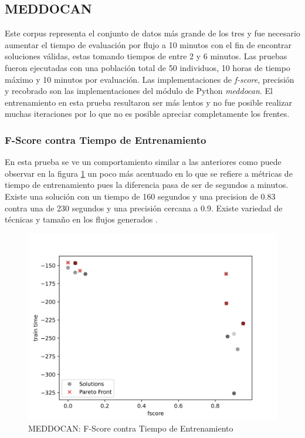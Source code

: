 \subsection{MEDDOCAN}
Este corpus representa el conjunto de datos m\'as grande de los tres y  fue necesario aumentar el tiempo de evaluaci\'on por flujo a 10 minutos con el fin de encontrar soluciones v\'alidas, estas tomando tiempos de entre 2 y 6 minutos. Las pruebas fueron ejecutadas con una poblaci\'on total de 50 individuos, 10 horas de tiempo m\'aximo y 10 minutos por evaluaci\'on. 
Las implementaciones de \textit{f-score}, precisi\'on y recobrado son las implementaciones del m\'odulo de Python \textit{meddocan}.
El entrenamiento en esta prueba resultaron ser m\'as lentos y no fue posible realizar muchas iteraciones por lo que no es posible apreciar completamente los frentes.


\subsubsection{F-Score contra Tiempo de Entrenamiento}
En esta prueba se ve un comportamiento similar a las anteriores como puede observar en la figura  \ref{impl:fig:MEDDOCAN:fscore_vs_train_time} un poco m\'as acentuado en lo que se refiere a m\'etricas de tiempo de entrenamiento pues la diferencia pasa de ser de segundos a minutos. Existe una soluci\'on con un tiempo de 160 segundos y una precision de 0.83 contra una de 230 segundos y una precisi\'on cercana a 0.9. Existe variedad de t\'ecnicas y tama\~no en los flujos generados .


\begin{figure}[ht]
    \centering
    \includegraphics[scale=0.65]{Pictures/meddocan_fscore_vs_train.jpg}
    \caption{MEDDOCAN: F-Score contra Tiempo de Entrenamiento}
    \label{impl:fig:MEDDOCAN:fscore_vs_train_time}
\end{figure}


